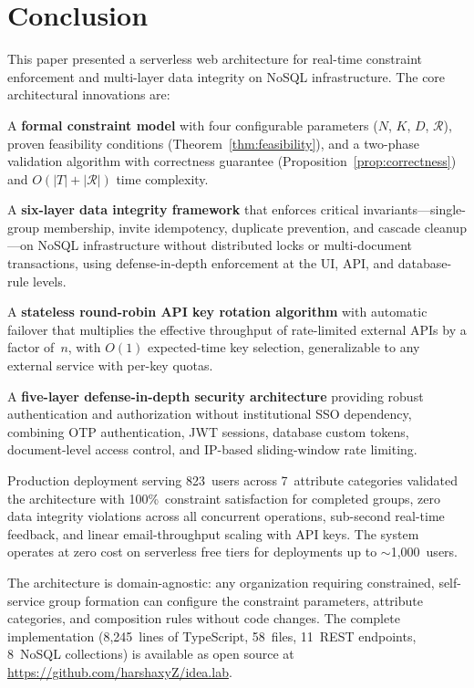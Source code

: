\documentclass[11pt,a4paper]{article}
\theoremstyle{plain}
\theoremstyle{definition}
\begin{document}
\section{Conclusion}
\label{sec:conclusion}

This paper presented a serverless web architecture for real-time constraint enforcement and multi-layer data integrity on NoSQL infrastructure. The core architectural innovations are:

A \textbf{formal constraint model} with four configurable parameters ($N$, $K$, $D$, $\mathcal{R}$), proven feasibility conditions (Theorem~\ref{thm:feasibility}), and a two-phase validation algorithm with correctness guarantee (Proposition~\ref{prop:correctness}) and $O(|T| + |\mathcal{R}|)$ time complexity.

A \textbf{six-layer data integrity framework} that enforces critical invariants---single-group membership, invite idempotency, duplicate prevention, and cascade cleanup---on NoSQL infrastructure without distributed locks or multi-document transactions, using defense-in-depth enforcement at the UI, API, and database-rule levels.

A \textbf{stateless round-robin API key rotation algorithm} with automatic failover that multiplies the effective throughput of rate-limited external APIs by a factor of~$n$, with $O(1)$ expected-time key selection, generalizable to any external service with per-key quotas.

A \textbf{five-layer defense-in-depth security architecture} providing robust authentication and authorization without institutional SSO dependency, combining OTP authentication, JWT sessions, database custom tokens, document-level access control, and IP-based sliding-window rate limiting.

Production deployment serving 823~users across 7~attribute categories validated the architecture with 100\%~constraint satisfaction for completed groups, zero data integrity violations across all concurrent operations, sub-second real-time feedback, and linear email-throughput scaling with API keys. The system operates at zero cost on serverless free tiers for deployments up to $\sim$1,000~users.

The architecture is domain-agnostic: any organization requiring constrained, self-service group formation can configure the constraint parameters, attribute categories, and composition rules without code changes. The complete implementation (8,245~lines of TypeScript, 58~files, 11~REST endpoints, 8~NoSQL collections) is available as open source at \url{https://github.com/harshaxyZ/idea.lab}.
\end{document}
